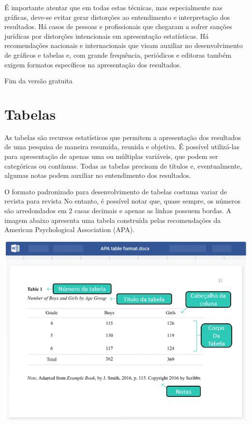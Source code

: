 \documentclass[
]{book}
\begin{document}
É importante atentar que em todas estas técnicas, mas especialmente nas gráficas, deve-se evitar gerar distorções ao entendimento e interpretação dos resultados. Há casos de pessoas e profissionais que chegaram a sofrer sanções jurídicas por distorções intencionais em apresentação estatísticas. Há recomendações nacionais e internacionais que visam auxiliar no desenvolvimento de gráficos e tabelas e, com grande frequência, periódicos e editoras também exigem formatos específicos na apresentação dos resultados.

Fim da versão gratuita

\hypertarget{tabelas}{%
\section{Tabelas}\label{tabelas}}

As tabelas são recursos estatísticos que permitem a apresentação dos resultados de uma pesquisa de maneira resumida, reunida e objetiva. É possível utilizá-las para apresentação de apenas uma ou múltiplas variáveis, que podem ser categóricas ou contínuas. Todas as tabelas precisam de títulos e, eventualmente, algumas notas podem auxiliar no entendimento dos resultados.

O formato padronizado para desenvolvimento de tabelas costuma variar de revista para revista No entanto, é possível notar que, quase sempre, os números são arredondados em 2 casas decimais e apenas as linhas possuem bordas. A imagem abaixo apresenta uma tabela construída pelas recomendações da American Psychological Association (APA).

\includegraphics{./img/cap_desc_tabela.png}
\end{document}
